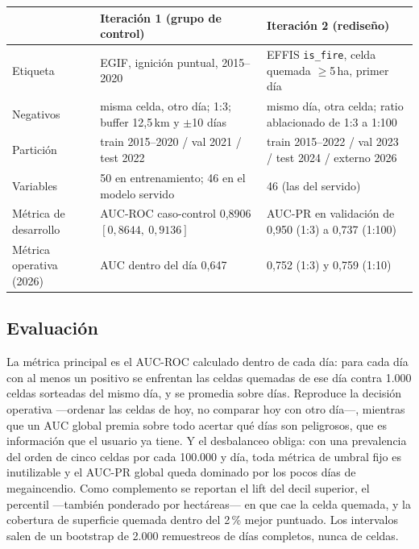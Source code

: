\documentclass[10pt,a4paper]{article}
\newcommand{\var}[1]{\texttt{\footnotesize #1}}
\begin{document}
\begin{center}\footnotesize
\begin{tabular}{@{}L{2.9cm}L{6.2cm}L{6.2cm}@{}}
\toprule
 & \textbf{Iteración 1 (grupo de control)} & \textbf{Iteración 2 (rediseño)} \\
\midrule
Etiqueta & EGIF, ignición puntual, 2015--2020 & EFFIS \var{is\_fire}, celda quemada $\geq$5\,ha, primer día \\
Negativos & misma celda, otro día; 1:3; buffer 12,5\,km y $\pm$10 días & mismo día, otra celda; ratio ablacionado de 1:3 a 1:100 \\
Partición & train 2015--2020 / val 2021 / test 2022 & train 2015--2022 / val 2023 / test 2024 / externo 2026 \\
Variables & 50 en entrenamiento; 46 en el modelo servido & 46 (las del servido) \\
Métrica de desarrollo & AUC-ROC caso-control 0,8906 $[0,8644,\ 0,9136]$ & AUC-PR en validación de 0,950 (1:3) a 0,737 (1:100) \\
Métrica operativa (2026) & AUC dentro del día 0,647 & 0,752 (1:3) y 0,759 (1:10) \\
\bottomrule
\end{tabular}
\label{tab:t1}
\end{center}

\subsection{Evaluación}

La métrica principal es el AUC-ROC calculado dentro de cada día: para cada día
con al menos un positivo se enfrentan las celdas quemadas de ese día contra 1.000
celdas sorteadas del mismo día, y se promedia sobre días. Reproduce la decisión
operativa ---ordenar las celdas de hoy, no comparar hoy con otro día---, mientras
que un AUC global premia sobre todo acertar qué días son peligrosos, que es
información que el usuario ya tiene. Y el desbalanceo obliga: con una prevalencia
del orden de cinco celdas por cada 100.000 y día, toda métrica de umbral fijo es
inutilizable y el AUC-PR global queda dominado por los pocos días de
megaincendio. Como complemento se
reportan el lift del decil superior, el percentil ---también ponderado por
hectáreas--- en que cae la celda quemada, y la cobertura de superficie quemada
dentro del 2\,\% mejor puntuado. Los intervalos salen de un bootstrap de 2.000
remuestreos de días completos, nunca de celdas.
\end{document}
